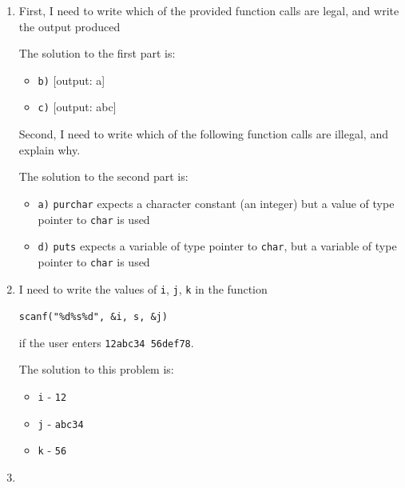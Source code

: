 \documentclass[12pt]{article}
\begin{document}
\begin{enumerate}[1.]
    \item

    First, I need to write which of the provided function calls are legal, and write the output
    produced

    \bigskip

    The solution to the first part is:

    \begin{itemize}
        \item \texttt{b)} [output: a]
        \item \texttt{c)} [output: abc]
    \end{itemize}

    \bigskip

    Second, I need to write which of the following function calls are illegal, and explain why.

    \bigskip

    The solution to the second part is:

    \begin{itemize}
        \item \texttt{a)} \texttt{purchar} expects a character constant (an integer) but a value of type pointer to \texttt{char} is used
        \item \texttt{d)} \texttt{puts} expects a variable of type pointer to \texttt{char}, but a variable of type pointer to \texttt{char} is used
    \end{itemize}

    \item

    I need to write the values of \texttt{i}, \texttt{j}, \texttt{k} in the function

    \bigskip

    \texttt{scanf("\%d\%s\%d", \&i, s, \&j)}

    \bigskip

    if the user enters \texttt{12abc34 56def78}.

    \bigskip

    The solution to this problem is:

    \begin{itemize}
        \item \texttt{i} - \texttt{12}
        \item \texttt{j} - \texttt{abc34 }
        \item \texttt{k} - \texttt{56}
    \end{itemize}

    \item


\end{enumerate}
\end{document}
